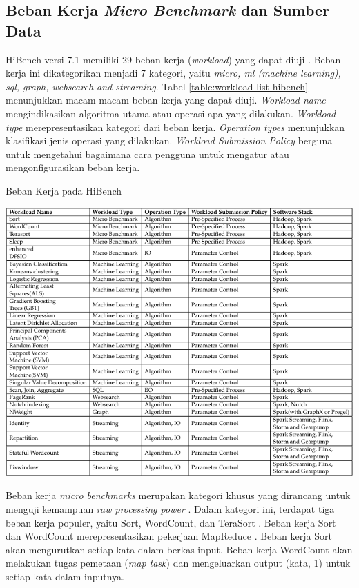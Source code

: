 \subsection{Beban Kerja \textit{Micro Benchmark} dan Sumber Data}
HiBench versi 7.1 memiliki 29 beban kerja (\textit{workload}) yang dapat diuji \cite{IntelbigdataHiBench2023}. Beban kerja ini dikategorikan menjadi 7 kategori, yaitu \textit{micro, ml (machine learning), sql, graph, websearch and streaming}. Tabel \ref{table:workload-list-hibench} menunjukkan macam-macam beban kerja yang dapat diuji. \textit{Workload name} mengindikasikan algoritma utama atau operasi apa yang dilakukan. \textit{Workload type} merepresentasikan kategori dari beban kerja. \textit{Operation types} menunjukkan klasifikasi jenis operasi yang dilakukan. \textit{Workload Submission Policy} berguna untuk mengetahui bagaimana cara pengguna untuk mengatur atau mengonfigurasikan beban kerja.

\begin{table}[h]
  \centering
  \caption{Beban Kerja pada HiBench \cite{barosenAnalysisComparisonInterfacing2018}}
  \includegraphics[width=1\textwidth]{figures/ch02/workload-hibench}
  \label{table:workload-list-hibench}
\end{table}

Beban kerja \textit{micro benchmarks} merupakan kategori khusus yang dirancang untuk menguji kemampuan \textit{raw processing power} \cite{barosenAnalysisComparisonInterfacing2018}. Dalam kategori ini, terdapat tiga beban kerja populer, yaitu Sort, WordCount, dan TeraSort \cite{huangHiBenchBenchmarkSuitea}. Beban kerja Sort dan WordCount merepresentasikan pekerjaan MapReduce \cite{deanMapReduceSimplifiedData2004}. Beban kerja Sort akan mengurutkan setiap kata dalam berkas input. Beban kerja WordCount akan melakukan tugas pemetaan (\textit{map task}) dan mengeluarkan output (kata, 1) untuk setiap kata dalam inputnya.  

